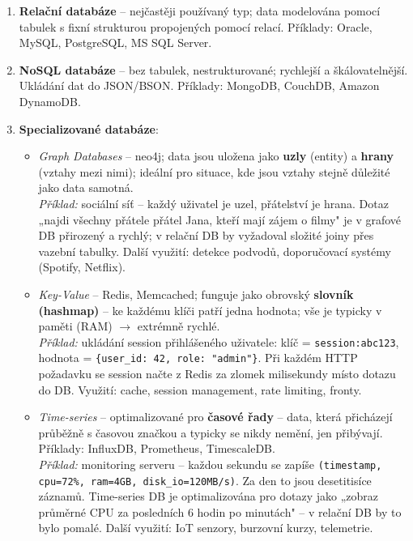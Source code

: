 \begin{enumerate}
  \item \textbf{Relační databáze} -- nejčastěji používaný typ; data modelována pomocí tabulek s fixní strukturou
    propojených pomocí relací. Příklady: Oracle, MySQL, PostgreSQL, MS SQL Server.

  \item \textbf{NoSQL databáze} -- bez tabulek, nestrukturované; rychlejší a škálovatelnější.
    Ukládání dat do JSON/BSON. Příklady: MongoDB, CouchDB, Amazon DynamoDB.

  \item \textbf{Specializované databáze}:
    \begin{itemize}
      \item \textit{Graph Databases} -- neo4j; data jsou uložena jako \textbf{uzly} (entity) a
        \textbf{hrany} (vztahy mezi nimi); ideální pro situace, kde jsou vztahy stejně důležité
        jako data samotná. \\
        \textit{Příklad:} sociální síť -- každý uživatel je uzel, přátelství je hrana.
        Dotaz „najdi všechny přátele přátel Jana, kteří mají zájem o filmy" je v grafové DB
        přirozený a rychlý; v relační DB by vyžadoval složité joiny přes vazební tabulky.
        Další využití: detekce podvodů, doporučovací systémy (Spotify, Netflix).

      \item \textit{Key-Value} -- Redis, Memcached; funguje jako obrovský \textbf{slovník (hashmap)}
        -- ke každému klíči patří jedna hodnota; vše je typicky v paměti (RAM) $\to$ extrémně rychlé. \\
        \textit{Příklad:} ukládání session přihlášeného uživatele:
        klíč = \texttt{session:abc123}, hodnota = \texttt{\{user\_id: 42, role: "admin"\}}.
        Při každém HTTP požadavku se session načte z Redis za zlomek milisekundy místo dotazu do DB.
        Využití: cache, session management, rate limiting, fronty.

      \item \textit{Time-series} -- optimalizované pro \textbf{časové řady} -- data, která přicházejí
        průběžně s časovou značkou a typicky se nikdy nemění, jen přibývají.
        Příklady: InfluxDB, Prometheus, TimescaleDB. \\
        \textit{Příklad:} monitoring serveru -- každou sekundu se zapíše
        \texttt{(timestamp, cpu=72\%, ram=4GB, disk\_io=120MB/s)}.
        Za den to jsou desetitisíce záznamů. Time-series DB je optimalizována pro dotazy jako
        „zobraz průměrné CPU za posledních 6 hodin po minutách" -- v relační DB by to bylo pomalé.
        Další využití: IoT senzory, burzovní kurzy, telemetrie.


\end{itemize}
\end{enumerate}
